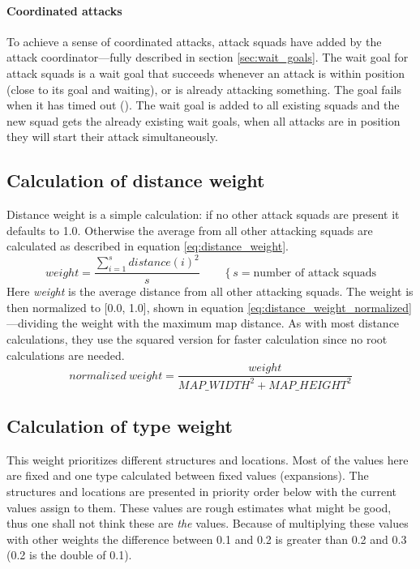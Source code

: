 \paragraph{Coordinated attacks}
To achieve a sense of coordinated attacks, attack squads have  added by the attack coordinator—fully described in section \ref{sec:wait_goals}. The wait goal for attack squads is a wait goal that succeeds whenever an attack is within position (close to its goal and waiting), or is already attacking something. The goal fails when it has timed out (\attackCoordinatorWaitGoalTimeout). The wait goal is added to all existing squads and the new squad gets the already existing wait goals, when all attacks are in position they will start their attack simultaneously.

\subsection{Calculation of distance weight}
Distance weight is a simple calculation: if no other attack squads are present it defaults to 1.0. Otherwise the average from all other attacking squads are calculated as described in equation \ref{eq:distance_weight}.
\begin{equation}
\label{eq:distance_weight}
weight = \frac{\sum_{i=1}^{s}{distance(i)^2}}{s} \qquad \left\{s = \text{number of attack squads}\right.
\end{equation}
Here \emph{weight} is the average distance from all other attacking squads. The weight is then normalized to [0.0, 1.0], shown in equation \ref{eq:distance_weight_normalized}—dividing the weight with the maximum map distance. As with most distance calculations, they use the squared version for faster calculation since no root calculations are needed.
\begin{equation}
\label{eq:distance_weight_normalized}
normalized\ weight = \frac{weight}{MAP\_WIDTH^2 + MAP\_HEIGHT^2}
\end{equation}


\subsection{Calculation of type weight}
This weight prioritizes different structures and locations. Most of the values here are fixed and one type calculated between fixed values (expansions). The structures and locations are presented in priority order below with the current values assign to them. These values are rough estimates what might be good, thus one shall not think these are \emph{the} values. Because of multiplying these values with other weights the difference between 0.1 and 0.2 is greater than 0.2 and 0.3 (0.2 is the double of 0.1).


